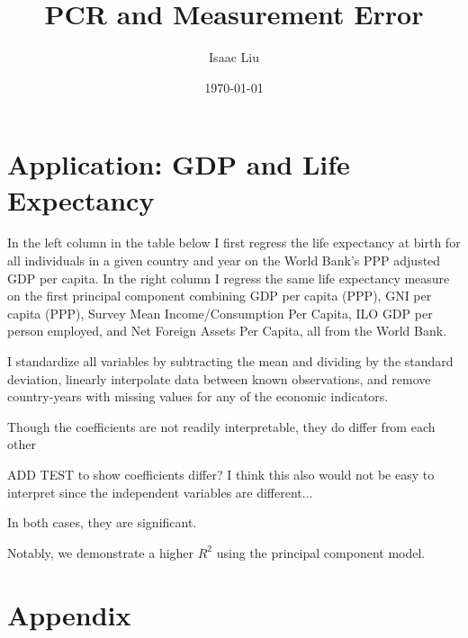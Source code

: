 \documentclass{report}
\title{PCR and Measurement Error}
\author{Isaac Liu}
\date{\today}
\begin{document}
	\maketitle

	\newpage \clearpage

    \section*{Application: GDP and Life Expectancy}

	In the left column in the table below I first regress the life expectancy at birth for all individuals in a given country and year on the World Bank's PPP adjusted GDP per capita. In the right column I regress the same life expectancy measure on the first principal component combining GDP per capita (PPP), GNI per capita (PPP), Survey Mean Income/Consumption Per Capita, ILO GDP per person employed, and Net Foreign Assets Per Capita, all from the World Bank.
	
	I standardize all variables by subtracting the mean and dividing by the standard deviation, linearly interpolate data between known observations, and remove country-years with missing values for any of the economic indicators.

    

	Though the coefficients are not readily interpretable, they do differ from each other

	ADD TEST to show coefficients differ? I think this also would not be easy to interpret since the independent variables are different...

	In both cases, they are significant.
	
	Notably, we demonstrate a higher $R^2$ using the principal component model.

    \clearpage \newpage

    \appendix

    \section*{Appendix}
\end{document}
